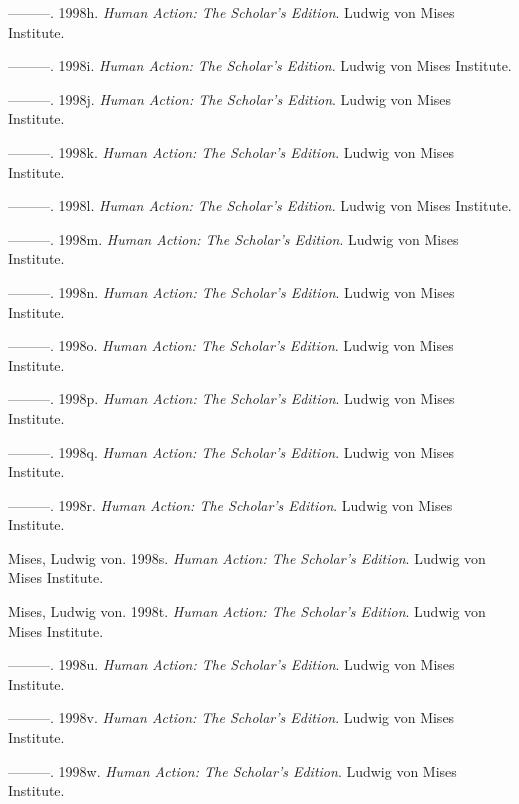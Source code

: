 \documentclass[
  a5paper,
  smalldemyvopaper,11pt,twoside,onecolumn,openright,extrafontsizes,
hidelinks]{memoir}
\newlength{\cslhangindent}
\newenvironment{CSLReferences}[2] %
 {\begin{list}{}{%
  \setlength{\itemindent}{0pt}
  \setlength{\leftmargin}{0pt}
  \setlength{\parsep}{0pt}
  \ifodd #1
   \setlength{\leftmargin}{\cslhangindent}
   \setlength{\itemindent}{-1\cslhangindent}
  \fi
  \setlength{\itemsep}{#2\baselineskip}}}
 {\end{list}}
\begin{document}
\begin{CSLReferences}{1}{0}
---------. 1998h. \emph{Human Action: The Scholar's Edition}. Ludwig von
Mises Institute.

---------. 1998i. \emph{Human Action: The Scholar's Edition}. Ludwig von
Mises Institute.

---------. 1998j. \emph{Human Action: The Scholar's Edition}. Ludwig von
Mises Institute.

---------. 1998k. \emph{Human Action: The Scholar's Edition}. Ludwig von
Mises Institute.

---------. 1998l. \emph{Human Action: The Scholar's Edition}. Ludwig von
Mises Institute.

---------. 1998m. \emph{Human Action: The Scholar's Edition}. Ludwig von
Mises Institute.

---------. 1998n. \emph{Human Action: The Scholar's Edition}. Ludwig von
Mises Institute.

---------. 1998o. \emph{Human Action: The Scholar's Edition}. Ludwig von
Mises Institute.

---------. 1998p. \emph{Human Action: The Scholar's Edition}. Ludwig von
Mises Institute.

---------. 1998q. \emph{Human Action: The Scholar's Edition}. Ludwig von
Mises Institute.

---------. 1998r. \emph{Human Action: The Scholar's Edition}. Ludwig von
Mises Institute.

Mises, Ludwig von. 1998s. \emph{Human Action: The Scholar's Edition}.
Ludwig von Mises Institute.

Mises, Ludwig von. 1998t. \emph{Human Action: The Scholar's Edition}.
Ludwig von Mises Institute.

---------. 1998u. \emph{Human Action: The Scholar's Edition}. Ludwig von
Mises Institute.

---------. 1998v. \emph{Human Action: The Scholar's Edition}. Ludwig von
Mises Institute.

---------. 1998w. \emph{Human Action: The Scholar's Edition}. Ludwig von
Mises Institute.


\end{CSLReferences}
\end{document}
